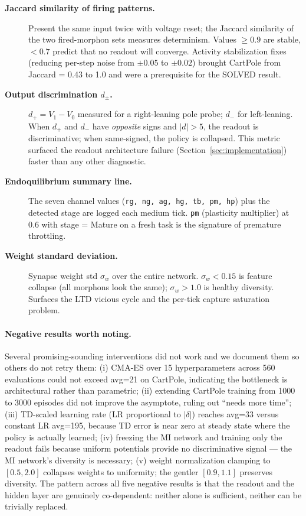 \begin{description}
  \item[\textbf{Jaccard similarity of firing patterns.}] Present the same input twice with voltage reset; the Jaccard similarity of the two fired-morphon sets measures determinism. Values $\geq 0.9$ are stable, $< 0.7$ predict that no readout will converge. Activity stabilization fixes (reducing per-step noise from $\pm 0.05$ to $\pm 0.02$) brought CartPole from Jaccard = 0.43 to 1.0 and were a prerequisite for the SOLVED result.
  \item[\textbf{Output discrimination $d_\pm$.}] $d_+ = V_1 - V_0$ measured for a right-leaning pole probe; $d_-$ for left-leaning. When $d_+$ and $d_-$ have \emph{opposite} signs and $|d| > 5$, the readout is discriminative; when same-signed, the policy is collapsed. This metric surfaced the readout architecture failure (Section~\ref{sec:implementation}) faster than any other diagnostic.
  \item[\textbf{Endoquilibrium summary line.}] The seven channel values (\texttt{rg, ng, ag, hg, tb, pm, hp}) plus the detected stage are logged each medium tick. \texttt{pm} (plasticity multiplier) at 0.6 with stage = Mature on a fresh task is the signature of premature throttling.
  \item[\textbf{Weight standard deviation.}] Synapse weight std $\sigma_w$ over the entire network. $\sigma_w < 0.15$ is feature collapse (all morphons look the same); $\sigma_w > 1.0$ is healthy diversity. Surfaces the LTD vicious cycle and the per-tick capture saturation problem.
\end{description}

\paragraph{Negative results worth noting.}
Several promising-sounding interventions did not work and we document them so others do not retry them: (i) CMA-ES over 15 hyperparameters across 560 evaluations could not exceed avg=21 on CartPole, indicating the bottleneck is architectural rather than parametric; (ii) extending CartPole training from 1000 to 3000 episodes did not improve the asymptote, ruling out ``needs more time''; (iii) TD-scaled learning rate (LR proportional to $|\delta|$) reaches avg=33 versus constant LR avg=195, because TD error is near zero at steady state where the policy is actually learned; (iv) freezing the MI network and training only the readout fails because uniform potentials provide no discriminative signal --- the MI network's diversity is necessary; (v) weight normalization clamping to $[0.5, 2.0]$ collapses weights to uniformity; the gentler $[0.9, 1.1]$ preserves diversity. The pattern across all five negative results is that the readout and the hidden layer are genuinely co-dependent: neither alone is sufficient, neither can be trivially replaced.
